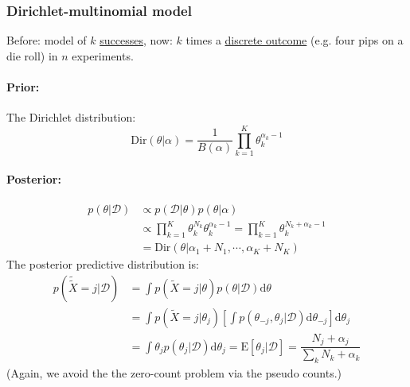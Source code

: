 \documentclass[../main.tex]{subfiles}
\begin{document}
    \subsubsection{Dirichlet-multinomial model}
    Before: model of $k$ \underline{successes}, now: $k$ times a \underline{discrete outcome} (e.g. four pips on a die roll) in $n$ experiments. 
        \paragraph{Prior:} The Dirichlet distribution:
            $$ 
            \text{Dir}(\theta|\alpha) = \dfrac{1}{B({\alpha})}\prod\limits_{k=1}^K \theta_k^{\alpha_k-1}
            $$
        \paragraph{Posterior:}
            \begin{align*}
            p({\theta}|\mathcal{D})& \propto p(\mathcal{D}|{\theta})p({\theta|\alpha}) \\
                & \propto \prod\limits_{k=1}^K\theta_k^{N_k}\theta_k^{\alpha_k-1} = \prod\limits_{k=1}^K\theta_k^{N_k+\alpha_k-1}\\
                & =\text{Dir}({\theta}|\alpha_1+N_1,\cdots,\alpha_K+N_K)
            \end{align*}
            The posterior predictive distribution is:
            \begin{align*}
                p(\tilde{\tilde{X}}=j|\mathcal{D})& =\int p(\tilde{X}=j|{\theta})p({\theta}|\mathcal{D})\mathrm{d}{\theta} \\
                    & =\int p(\tilde{X}=j|\theta_j)\left[\int p({\theta}_{-j}, \theta_j|\mathcal{D})\mathrm{d}{\theta}_{-j}\right]\mathrm{d}\theta_j \\
                    & =\int \theta_jp(\theta_j|\mathcal{D})\mathrm{d}\theta_j=\text{E}[\theta_j|\mathcal{D}]=\dfrac{N_j+\alpha_j}{\sum_k N_k+\alpha_k}
                \end{align*}
                (Again, we avoid the the zero-count problem via the pseudo counts.)
\end{document}
